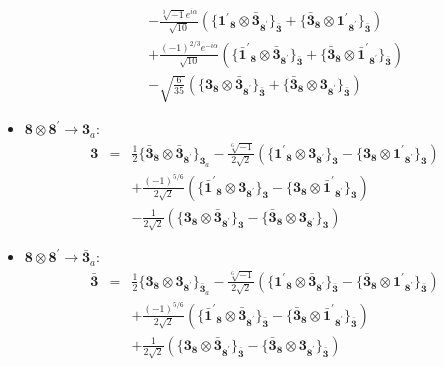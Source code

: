 \documentclass[english]{article}
\newcommand{\subcg}[3]{\big\{ {#1}\otimes{#2}\big\}^{}_{#3}}
\newcommand{\rep}[1]{\mathbf{#1}}
\begin{document}
\begin{itemize}
\begin{eqnarray*}
 & & -\frac{\sqrt[3]{-1} e^{i \alpha }}{\sqrt{10}}\left(\subcg{\rep{1^{\prime}}_{\rep{8}}}{\rep{\bar{3}}_{\rep{8^{\prime}}}}{\rep{\bar{3}}}+\subcg{\rep{\bar{3}}_{\rep{8}}}{\rep{1^{\prime}}_{\rep{8^{\prime}}}}{\rep{\bar{3}}}\right) \\ 
 & & +\frac{(-1)^{2/3} e^{-i \alpha }}{\sqrt{10}}\left(\subcg{\rep{\bar{1}^{\prime}}_{\rep{8}}}{\rep{\bar{3}}_{\rep{8^{\prime}}}}{\rep{\bar{3}}}+\subcg{\rep{\bar{3}}_{\rep{8}}}{\rep{\bar{1}^{\prime}}_{\rep{8^{\prime}}}}{\rep{\bar{3}}}\right) \\ 
 & & -\sqrt{\frac{6}{35}}\left(\subcg{\rep{3}_{\rep{8}}}{\rep{\bar{3}}_{\rep{8^{\prime}}}}{\rep{\bar{3}}}+\subcg{\rep{\bar{3}}_{\rep{8}}}{\rep{3}_{\rep{8^{\prime}}}}{\rep{\bar{3}}}\right)
\end{eqnarray*}
\item $\rep{8}\otimes\rep{8^{\prime}}\to\rep{3}_{a}$:
\begin{eqnarray*}
\rep{3} &=& \frac{1}{2}\subcg{\rep{\bar{3}}_{\rep{8}}}{\rep{\bar{3}}_{\rep{8^{\prime}}}}{\rep{3}_{a}}-\frac{\sqrt[6]{-1}}{2 \sqrt{2}}\left(\subcg{\rep{1^{\prime}}_{\rep{8}}}{\rep{3}_{\rep{8^{\prime}}}}{\rep{3}}-\subcg{\rep{3}_{\rep{8}}}{\rep{1^{\prime}}_{\rep{8^{\prime}}}}{\rep{3}}\right) \\ 
 & & +\frac{(-1)^{5/6}}{2 \sqrt{2}}\left(\subcg{\rep{\bar{1}^{\prime}}_{\rep{8}}}{\rep{3}_{\rep{8^{\prime}}}}{\rep{3}}-\subcg{\rep{3}_{\rep{8}}}{\rep{\bar{1}^{\prime}}_{\rep{8^{\prime}}}}{\rep{3}}\right) \\ 
 & & -\frac{1}{2 \sqrt{2}}\left(\subcg{\rep{3}_{\rep{8}}}{\rep{\bar{3}}_{\rep{8^{\prime}}}}{\rep{3}}-\subcg{\rep{\bar{3}}_{\rep{8}}}{\rep{3}_{\rep{8^{\prime}}}}{\rep{3}}\right)
\end{eqnarray*}
\item $\rep{8}\otimes\rep{8^{\prime}}\to\rep{\bar{3}}_{a}$:
\begin{eqnarray*}
\rep{\bar{3}} &=& \frac{1}{2}\subcg{\rep{3}_{\rep{8}}}{\rep{3}_{\rep{8^{\prime}}}}{\rep{\bar{3}}_{a}}-\frac{\sqrt[6]{-1}}{2 \sqrt{2}}\left(\subcg{\rep{1^{\prime}}_{\rep{8}}}{\rep{\bar{3}}_{\rep{8^{\prime}}}}{\rep{\bar{3}}}-\subcg{\rep{\bar{3}}_{\rep{8}}}{\rep{1^{\prime}}_{\rep{8^{\prime}}}}{\rep{\bar{3}}}\right) \\ 
 & & +\frac{(-1)^{5/6}}{2 \sqrt{2}}\left(\subcg{\rep{\bar{1}^{\prime}}_{\rep{8}}}{\rep{\bar{3}}_{\rep{8^{\prime}}}}{\rep{\bar{3}}}-\subcg{\rep{\bar{3}}_{\rep{8}}}{\rep{\bar{1}^{\prime}}_{\rep{8^{\prime}}}}{\rep{\bar{3}}}\right) \\ 
 & & +\frac{1}{2 \sqrt{2}}\left(\subcg{\rep{3}_{\rep{8}}}{\rep{\bar{3}}_{\rep{8^{\prime}}}}{\rep{\bar{3}}}-\subcg{\rep{\bar{3}}_{\rep{8}}}{\rep{3}_{\rep{8^{\prime}}}}{\rep{\bar{3}}}\right)

\end{eqnarray*}
\end{itemize}
\end{document}
